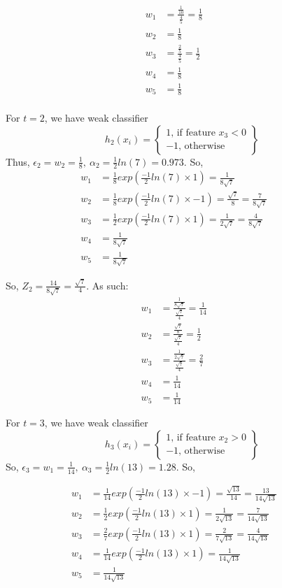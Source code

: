\documentclass[12pt]{article} %
\begin{document}
\begin{flushleft}
\begin{enumerate}
\begin{align*}
	w_1 &= \frac{\frac{1}{10}}{\frac{4}{5}} = \frac{1}{8}&&\\
	w_2 &= \frac{1}{8} &&\\
	w_3 &= \frac{\frac{2}{5}}{\frac{4}{5}} = \frac{1}{2}&&\\
	w_4 &= \frac{1}{8} &&\\
	w_5 &= \frac{1}{8}
\end{align*}
\\
For $t = 2$, we have weak classifier
\[h_2(x_i) = \left\{\begin{array}{lc}
1 \text{, if feature $x_3 < 0$} \\
-1 \text{, otherwise}
\end{array}\right\}\]
Thus, $\epsilon_2 = w_2 = \frac{1}{8},\ \alpha_2 = \frac{1}{2} ln(7) = 0.973$. So,
\begin{align*}
	w_1 &= \frac{1}{8}exp(\frac{-1}{2} ln(7) \times 1) = \frac{1}{8\sqrt{7}}&&\\
	w_2 &= \frac{1}{8}exp(\frac{-1}{2} ln(7) \times -1) = \frac{\sqrt{7}}{8} = \frac{7}{8\sqrt{7}}&&\\
	w_3 &= \frac{1}{2}exp(\frac{-1}{2} ln(7) \times 1) = \frac{1}{2\sqrt{7}} = \frac{4}{8\sqrt{7}}&&\\
	w_4 &= \frac{1}{8\sqrt{7}} &&\\
	w_5 &= \frac{1}{8\sqrt{7}}
\end{align*}

So, $Z_2 = \frac{14}{8\sqrt{7}} = \frac{\sqrt{7}}{4}$. As such:
\begin{align*}
	w_1 &= \frac{\frac{1}{8\sqrt{7}}}{\frac{\sqrt{7}}{4}} = \frac{1}{14}&&\\
	w_2 &= \frac{\frac{\sqrt{7}}{8}}{\frac{\sqrt{7}}{4}} = \frac{1}{2}&&\\
	w_3 &= \frac{\frac{1}{2\sqrt{7}}}{\frac{\sqrt{7}}{4}} = \frac{2}{7} &&\\
	w_4 &= \frac{1}{14}&&\\
	w_5 &= \frac{1}{14}
\end{align*}

For $t = 3$, we have weak classifier 
\[h_3(x_i) = \left\{\begin{array}{lc}
1 \text{, if feature $x_2 > 0$} \\
-1 \text{, otherwise}
\end{array}\right\}\]
So, $\epsilon_3 = w_1 = \frac{1}{14},\ \alpha_3 = \frac{1}{2}ln(13) = 1.28$. So,

\begin{align*}
	w_1 &= \frac{1}{14}exp(\frac{-1}{2}ln(13)\times -1) = \frac{\sqrt{13}}{14} = \frac{13}{14\sqrt{13}} &&\\
	w_2 &=  \frac{1}{2}exp(\frac{-1}{2}ln(13)\times 1) = \frac{1}{2\sqrt{13}} = \frac{7}{14\sqrt{13}}&&\\
	w_3 &= \frac{2}{7}exp(\frac{-1}{2}ln(13)\times 1) = \frac{2}{7\sqrt{13}} = \frac{4}{14\sqrt{13}}&&\\
	w_4 &= \frac{1}{14}exp(\frac{-1}{2}ln(13)\times 1) = \frac{1}{14\sqrt{13}}&&\\
	w_5 &= \frac{1}{14\sqrt{13}}
\end{align*}


\end{enumerate}
\end{flushleft}
\end{document}
